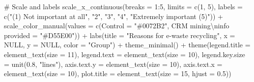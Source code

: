 \documentclass[
  letterpaper,
  DIV=11,
  numbers=noendperiod]{scrartcl}
\newenvironment{Shaded}{\begin{snugshade}}{\end{snugshade}}
\newcommand{\AttributeTok}[1]{\textcolor[rgb]{0.40,0.45,0.13}{#1}}
\newcommand{\CommentTok}[1]{\textcolor[rgb]{0.37,0.37,0.37}{#1}}
\newcommand{\ConstantTok}[1]{\textcolor[rgb]{0.56,0.35,0.01}{#1}}
\newcommand{\DecValTok}[1]{\textcolor[rgb]{0.68,0.00,0.00}{#1}}
\newcommand{\FloatTok}[1]{\textcolor[rgb]{0.68,0.00,0.00}{#1}}
\newcommand{\FunctionTok}[1]{\textcolor[rgb]{0.28,0.35,0.67}{#1}}
\newcommand{\NormalTok}[1]{\textcolor[rgb]{0.00,0.23,0.31}{#1}}
\newcommand{\OtherTok}[1]{\textcolor[rgb]{0.00,0.23,0.31}{#1}}
\newcommand{\SpecialCharTok}[1]{\textcolor[rgb]{0.37,0.37,0.37}{#1}}
\newcommand{\StringTok}[1]{\textcolor[rgb]{0.13,0.47,0.30}{#1}}
\begin{document}
\begin{Shaded}
\begin{Highlighting}[]
  \CommentTok{\# Scale and labels}
  \FunctionTok{scale\_x\_continuous}\NormalTok{(}\AttributeTok{breaks =} \DecValTok{1}\SpecialCharTok{:}\DecValTok{5}\NormalTok{, }\AttributeTok{limits =} \FunctionTok{c}\NormalTok{(}\DecValTok{1}\NormalTok{, }\DecValTok{5}\NormalTok{),}
                     \AttributeTok{labels =} \FunctionTok{c}\NormalTok{(}\StringTok{"(1) Not important at all"}\NormalTok{, }\StringTok{"2"}\NormalTok{, }\StringTok{"3"}\NormalTok{, }\StringTok{"4"}\NormalTok{, }\StringTok{"Extremely important (5)"}\NormalTok{)) }\SpecialCharTok{+}
  \FunctionTok{scale\_color\_manual}\NormalTok{(}\AttributeTok{values =} \FunctionTok{c}\NormalTok{(}\AttributeTok{Control =} \StringTok{"\#0072B2"}\NormalTok{, }\StringTok{\textasciigrave{}}\AttributeTok{CRM mining}\SpecialCharTok{\textbackslash{}n}\AttributeTok{info provided}\StringTok{\textasciigrave{}} \OtherTok{=} \StringTok{"\#D55E00"}\NormalTok{)) }\SpecialCharTok{+}
  \FunctionTok{labs}\NormalTok{(}\AttributeTok{title =} \StringTok{"Reasons for e{-}waste recycling"}\NormalTok{,}
       \AttributeTok{x =} \ConstantTok{NULL}\NormalTok{, }\AttributeTok{y =} \ConstantTok{NULL}\NormalTok{, }\AttributeTok{color =} \StringTok{"Group"}\NormalTok{) }\SpecialCharTok{+}
  \FunctionTok{theme\_minimal}\NormalTok{() }\SpecialCharTok{+}
  \FunctionTok{theme}\NormalTok{(}\AttributeTok{legend.title =} \FunctionTok{element\_text}\NormalTok{(}\AttributeTok{size =} \DecValTok{11}\NormalTok{), }\AttributeTok{legend.text =} \FunctionTok{element\_text}\NormalTok{(}\AttributeTok{size =} \DecValTok{10}\NormalTok{),}
        \AttributeTok{legend.key.size =} \FunctionTok{unit}\NormalTok{(}\FloatTok{0.8}\NormalTok{, }\StringTok{"lines"}\NormalTok{), }\AttributeTok{axis.text.y =} \FunctionTok{element\_text}\NormalTok{(}\AttributeTok{size =} \DecValTok{10}\NormalTok{),}
        \AttributeTok{axis.text.x =} \FunctionTok{element\_text}\NormalTok{(}\AttributeTok{size =} \DecValTok{10}\NormalTok{), }\AttributeTok{plot.title =} \FunctionTok{element\_text}\NormalTok{(}\AttributeTok{size =} \DecValTok{15}\NormalTok{, }\AttributeTok{hjust =} \FloatTok{0.5}\NormalTok{))}
\end{Highlighting}
\end{Shaded}
\end{document}
